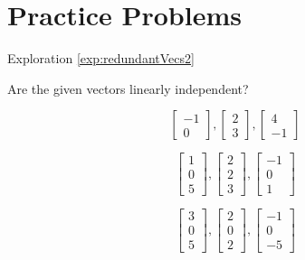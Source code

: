 \documentclass{ximera}
\begin{document}
\section*{Practice Problems}
\begin{problem}\label{prob:redundant1}
Exploration \ref{exp:redundantVecs2}
\end{problem}
\begin{problem} Are the given vectors linearly independent?

\begin{problem}\label{prob:linindmultchoice1}
$$\begin{bmatrix}-1\\0\end{bmatrix}, \begin{bmatrix}2\\3\end{bmatrix},\begin{bmatrix}4\\-1\end{bmatrix}$$

\begin{multipleChoice}
 \end{multipleChoice}
\end{problem}

\begin{problem}\label{prob:linindmultchoice2}
$$\begin{bmatrix}1\\0\\5\end{bmatrix}, \begin{bmatrix}2\\2\\3\end{bmatrix},\begin{bmatrix}-1\\0\\1\end{bmatrix}$$

\begin{multipleChoice}
 \end{multipleChoice}

\end{problem}

\begin{problem}\label{prob:linindmultchoice3}
$$\begin{bmatrix}3\\0\\5\end{bmatrix}, \begin{bmatrix}2\\0\\2\end{bmatrix},\begin{bmatrix}-1\\0\\-5\end{bmatrix}$$


\end{problem}
\end{problem}
\end{document}
